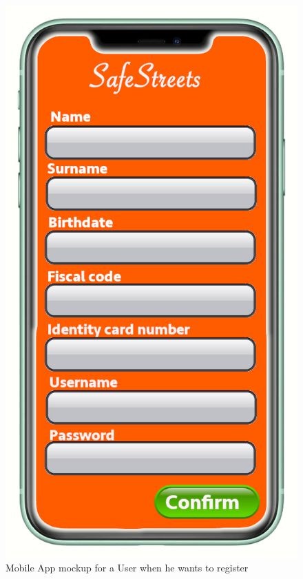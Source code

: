 \documentclass[a4paper]{report}
\begin{document}
\begin{figure}
\begin{minipage}{.45\textwidth}
\centering
\includegraphics[width=.7\linewidth]{mockups/Register.png}
\caption[Mobile App mockup for the registration]{Mobile App mockup for a User when he wants to register}
\label{fig:register-page}
\end{minipage}\hfill
\begin{minipage}{.45\textwidth}
\centering

\end{minipage}
\end{figure}
\end{document}
